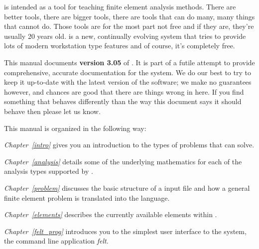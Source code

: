 
\newpage{\pagestyle{empty}\cleardoublepage}

\label{foreword.intro}

\felt{} is intended as a tool for teaching finite element analysis methods.
There are better tools, there are bigger tools, there are tools that
can do many, many things that \felt{} cannot do.  Those tools are for the
most part not free and if they are, they're usually 20 years old.  
\felt{} is a new, continually evolving system that tries to provide
lots of modern workstation type features and of course, it's completely free.  
 

This manual documents {\bf version 3.05} of \felt{}.  It is part of a futile 
attempt to provide comprehensive, accurate documentation for the
\felt{} system.  We do our best to try to keep it up-to-date with the latest 
version of the software; we make no guarantees however, and chances are good
that there are things wrong in here.  If you find something that behaves
differently than the way this document says it should behave then please
let us know.


\label{foreword.overview}
This manual is organized in the following way:

{\em Chapter~\ref{intro}} gives you an introduction to the types of problems that
\felt{} can solve.

{\em Chapter~\ref{analysis}} details some of the underlying mathematics for each
of the analysis types supported by \felt{}.

{\em Chapter~\ref{problem}} discusses the basic structure of a \felt{} input file
and how a general finite element problem is translated into the \felt{}
language.

{\em Chapter~\ref{elements}} describes the currently available elements within \felt{}.

{\em Chapter~\ref{felt_prog}} introduces you to the simplest user interface to the \felt{}
system, the command line application {\em felt}.

